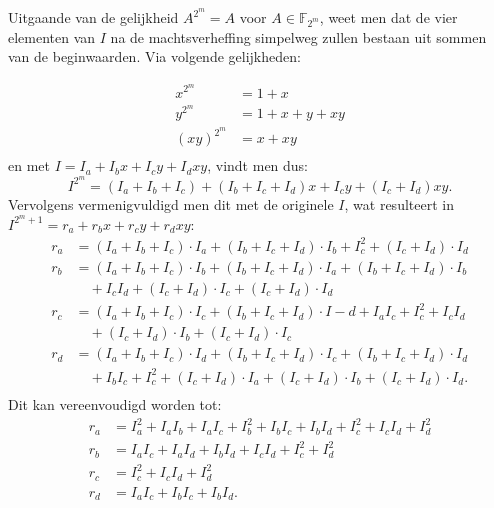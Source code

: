 Uitgaande van de gelijkheid $A^{2^m} = A$ voor $A \in \mathbb{F}_{2^{m}}$, weet men dat de vier elementen van $I$ na de machtsverheffing simpelweg zullen bestaan uit sommen van de beginwaarden. Via volgende gelijkheden:

\[\begin{aligned}
x^{2^m}	&= 1 + x\\
y^{2^m}	&= 1 + x + y + xy\\
(xy)^{2^m}	&= x + xy\\
\end{aligned}\]
en met $I = I_a + I_b x + I_c y + I_d xy$, vindt men dus:
\[I^{2^m} = (I_a + I_b + I_c) + (I_b + I_c + I_d) x + I_c y + (I_c + I_d) xy.\]
Vervolgens vermenigvuldigd men dit met de originele $I$, wat resulteert in $I^{2^m + 1} = r_a + r_b x + r_c y + r_d xy$:
\[\begin{aligned}
r_a	&= (I_a + I_b + I_c) \cdot I_a + (I_b + I_c + I_d) \cdot I_b + I_c^2 + (I_c + I_d) \cdot I_d\\
r_b	&= (I_a + I_b + I_c) \cdot I_b + (I_b + I_c + I_d) \cdot I_a + (I_b + I_c + I_d) \cdot I_b\\
		&\quad + I_c I_d + (I_c + I_d) \cdot I_c + (I_c + I_d) \cdot I_d\\
r_c	&= (I_a + I_b + I_c) \cdot I_c + (I_b + I_c + I_d) \cdot I-d + I_a I_c + I_c^2 + I_c I_d\\
		&\quad + (I_c + I_d) \cdot I_b + (I_c + I_d) \cdot I_c\\
r_d	&= (I_a + I_b + I_c) \cdot I_d + (I_b + I_c + I_d) \cdot I_c + (I_b + I_c + I_d) \cdot I_d\\
		&\quad + I_b I_c + I_c^2 + (I_c + I_d) \cdot I_a + (I_c + I_d) \cdot I_b + (I_c + I_d) \cdot I_d.\\
\end{aligned}\]
Dit kan vereenvoudigd worden tot:
\[\begin{aligned}
r_a	&= I_a^2 + I_a I_b + I_a I_c + I_b^2 + I_b I_c + I_b I_d + I_c^2 + I_c I_d + I_d^2\\
r_b	&= I_a I_c + I_a I_d + I_b I_d + I_c I_d + I_c^2 + I_d^2\\
r_c	&= I_c^2 + I_c I_d + I_d^2\\
r_d	&= I_a I_c + I_b I_c + I_b I_d.\\
\end{aligned}\]

